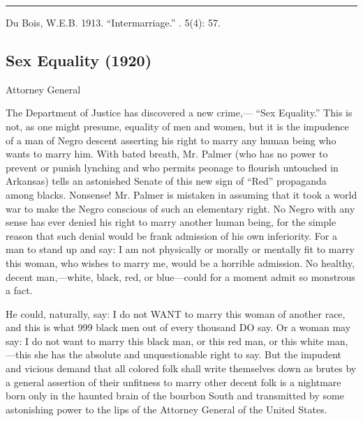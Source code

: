 \documentclass[letterpaper,10pt,english]{jupyterBook}
\begin{document}
\bigskip\hrule\bigskip


\sphinxAtStartPar
{} Du Bois, W.E.B. 1913. “Intermarriage.”  . 5(4): 57.


\subsection{Sex Equality (1920)}
\label{\detokenize{Volumes/19/03/sex_equality:sex-equality-1920}}\label{\detokenize{Volumes/19/03/sex_equality::doc}}
\begin{sphinxShadowBox}
\sphinxstylesidebartitle{}

\sphinxAtStartPar
Attorney General 
\end{sphinxShadowBox}

\sphinxAtStartPar
The Department of Justice has discovered a new crime,— “Sex Equality.” This is not, as one might presume, equality of men and women, but it is the impudence of a man of Negro descent asserting his right to marry any human being who wants to marry him. With bated breath, Mr. Palmer (who has no power to prevent or punish lynching and who permits peonage to flourish untouched in Arkansas) tells an astonished Senate of this new sign of “Red” propaganda among blacks. Nonsense! Mr. Palmer is mistaken in assuming that it took a world war to make the Negro conscious of such an elementary right. No Negro with any sense has ever denied his right to marry another human being, for the simple reason that such denial would be frank admission of his own inferiority. For a man to stand up and say: I am not physically or morally or mentally fit to marry this woman, who wishes to marry me, would be a horrible admission. No healthy, decent man,—white, black, red, or blue—could for a moment admit so monstrous a fact.

\sphinxAtStartPar
He could, naturally, say: I do not WANT to marry this woman of another race, and this is what 999 black men out of every thousand DO say. Or a woman may say: I do not want to marry this black man, or this red man, or this white man,—this she has the absolute and unquestionable right to say. But the impudent and vicious demand that all colored folk shall write themselves down as brutes by a general assertion of their unfitness to marry other decent folk is a nightmare born only in the haunted brain of the bourbon South and transmitted by some astonishing power to the lips of the Attorney General of the United States.
\end{document}
